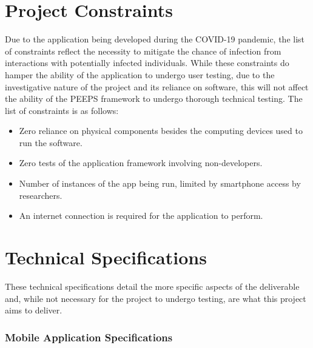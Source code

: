 \section{Project Constraints}
Due to the application being developed during the COVID-19 pandemic, the list of constraints reflect the necessity to mitigate the chance of infection from interactions with potentially infected individuals. While these constraints do hamper the ability of the application to undergo user testing, due to the investigative nature of the project and its reliance on software, this will not affect the ability of the PEEPS framework to undergo thorough technical testing. The list of constraints is as follows:

\begin{itemize}
    \item Zero reliance on physical components besides the computing devices used to run the software.
    \item Zero tests of the application framework involving non-developers.
    \item Number of instances of the app being run, limited by smartphone access by researchers.
    \item An internet connection is required for the application to perform.
\end{itemize}

\section{Technical Specifications}
These technical specifications detail the more specific aspects of the deliverable and, while not necessary for the project to undergo testing, are what this project aims to deliver.

\subsubsection{Mobile Application Specifications}

